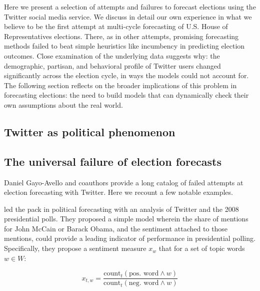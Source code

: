 \documentclass{article}
\begin{document}
Here we present a selection of attempts and failures to forecast
elections using the Twitter social media service. We discuss in detail
our own experience in what we believe to be the first attempt at
multi-cycle forecasting of U.S. House of Representatives
elections. There, as in other attempts, promising forecasting methods
failed to beat simple heuristics like incumbency in predicting
election outcomes. Close examination of the underlying data suggests
why: the demographic, partisan, and behavioral profile of Twitter
users changed significantly across the election cycle, in ways the
models could not account for. The following section reflects on the
broader implications of this problem in forecasting elections: the
need to build models that can dynamically check their own assumptions
about the real world.  %

\subsection{Twitter as political phenomenon}
\label{sec:twitter-as-political}


\subsection{The universal failure of election forecasts}
\label{sec:univ-fail-elect}

Daniel Gayo-Avello and coauthors \citep{gayo2011limits,metaxas2011not}
provide a long catalog of failed attempts at election forecasting with
Twitter. Here we recount a few notable examples. 

\cite{o2010tweets} led the pack in political forecasting with an
analysis of Twitter and the 2008 presidential polls. They proposed a
simple model wherein the share of mentions for John McCain or Barack
Obama, and the sentiment attached to those mentions, could provide a
leading indicator of performance in presidential
polling. Specifically, they propose a sentiment measure $x_w$ that for
a set of topic words $w \in W$:

\begin{equation}
  \label{eq:2}
  x_{t,w} = \frac{\textrm{count}_t(\textrm{pos. word} \wedge w)}{\textrm{count}_t(\textrm{neg. word} \wedge w)}
\end{equation}
\end{document}
